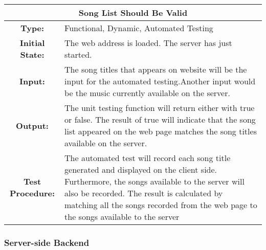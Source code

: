 \documentclass[12pt, titlepage]{article}
\begin{document}
\begin{center}
\begin{table}[H]
\begin{tabularx}{\textwidth}{| c X |}
\hline
\multicolumn{2}{|c|}{\textbf{Song List Should Be Valid}}\\
\hline
\textbf{Type: } & Functional, Dynamic, Automated Testing\\

\textbf{Initial State: } & The web address is loaded. The server has just started.\\

\textbf{Input: } & The song titles that appears on website will be the input for the automated testing.Another input would be the music currently available on the server.\\

\textbf{Output: } & The unit testing function will return either with true or false. The result of true will indicate that the song list appeared on the web page matches the song titles available on the server.\\

\textbf{Test Procedure:  } & The automated test will record each song title generated and displayed on the client side. Furthermore, the songs available to the server will also be recorded. The result is calculated by matching all the songs recorded from the web page to the songs available to the server\\
\hline
\end{tabularx}
\end{table}
\end{center}



\subsubsection{Server-side Backend}
\end{document}
